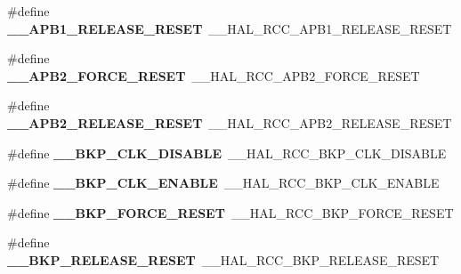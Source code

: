 \begin{DoxyCompactItemize}
\item 
\hypertarget{group___h_a_l___r_c_c___aliased_ga497e83304224dd4740b388fe296beaf0}{\#define {\bfseries \-\_\-\-\_\-\-A\-P\-B1\-\_\-\-R\-E\-L\-E\-A\-S\-E\-\_\-\-R\-E\-S\-E\-T}~\-\_\-\-\_\-\-H\-A\-L\-\_\-\-R\-C\-C\-\_\-\-A\-P\-B1\-\_\-\-R\-E\-L\-E\-A\-S\-E\-\_\-\-R\-E\-S\-E\-T}\label{group___h_a_l___r_c_c___aliased_ga497e83304224dd4740b388fe296beaf0}

\item 
\hypertarget{group___h_a_l___r_c_c___aliased_ga92a0e6fcc37827864d686e5d023d8472}{\#define {\bfseries \-\_\-\-\_\-\-A\-P\-B2\-\_\-\-F\-O\-R\-C\-E\-\_\-\-R\-E\-S\-E\-T}~\-\_\-\-\_\-\-H\-A\-L\-\_\-\-R\-C\-C\-\_\-\-A\-P\-B2\-\_\-\-F\-O\-R\-C\-E\-\_\-\-R\-E\-S\-E\-T}\label{group___h_a_l___r_c_c___aliased_ga92a0e6fcc37827864d686e5d023d8472}

\item 
\hypertarget{group___h_a_l___r_c_c___aliased_ga68340225a9f3449d73f454972cf01726}{\#define {\bfseries \-\_\-\-\_\-\-A\-P\-B2\-\_\-\-R\-E\-L\-E\-A\-S\-E\-\_\-\-R\-E\-S\-E\-T}~\-\_\-\-\_\-\-H\-A\-L\-\_\-\-R\-C\-C\-\_\-\-A\-P\-B2\-\_\-\-R\-E\-L\-E\-A\-S\-E\-\_\-\-R\-E\-S\-E\-T}\label{group___h_a_l___r_c_c___aliased_ga68340225a9f3449d73f454972cf01726}

\item 
\hypertarget{group___h_a_l___r_c_c___aliased_ga266ad5c1a161c961123d8f3d6db2fc69}{\#define {\bfseries \-\_\-\-\_\-\-B\-K\-P\-\_\-\-C\-L\-K\-\_\-\-D\-I\-S\-A\-B\-L\-E}~\-\_\-\-\_\-\-H\-A\-L\-\_\-\-R\-C\-C\-\_\-\-B\-K\-P\-\_\-\-C\-L\-K\-\_\-\-D\-I\-S\-A\-B\-L\-E}\label{group___h_a_l___r_c_c___aliased_ga266ad5c1a161c961123d8f3d6db2fc69}

\item 
\hypertarget{group___h_a_l___r_c_c___aliased_ga04daaca6a8e6c062dfc6dc3e50341b26}{\#define {\bfseries \-\_\-\-\_\-\-B\-K\-P\-\_\-\-C\-L\-K\-\_\-\-E\-N\-A\-B\-L\-E}~\-\_\-\-\_\-\-H\-A\-L\-\_\-\-R\-C\-C\-\_\-\-B\-K\-P\-\_\-\-C\-L\-K\-\_\-\-E\-N\-A\-B\-L\-E}\label{group___h_a_l___r_c_c___aliased_ga04daaca6a8e6c062dfc6dc3e50341b26}

\item 
\hypertarget{group___h_a_l___r_c_c___aliased_ga91a4e9e2dcb7942be268a76e233c4bf2}{\#define {\bfseries \-\_\-\-\_\-\-B\-K\-P\-\_\-\-F\-O\-R\-C\-E\-\_\-\-R\-E\-S\-E\-T}~\-\_\-\-\_\-\-H\-A\-L\-\_\-\-R\-C\-C\-\_\-\-B\-K\-P\-\_\-\-F\-O\-R\-C\-E\-\_\-\-R\-E\-S\-E\-T}\label{group___h_a_l___r_c_c___aliased_ga91a4e9e2dcb7942be268a76e233c4bf2}

\item 
\hypertarget{group___h_a_l___r_c_c___aliased_ga3b4efa57000a06d76a4c40feff772416}{\#define {\bfseries \-\_\-\-\_\-\-B\-K\-P\-\_\-\-R\-E\-L\-E\-A\-S\-E\-\_\-\-R\-E\-S\-E\-T}~\-\_\-\-\_\-\-H\-A\-L\-\_\-\-R\-C\-C\-\_\-\-B\-K\-P\-\_\-\-R\-E\-L\-E\-A\-S\-E\-\_\-\-R\-E\-S\-E\-T}\label{group___h_a_l___r_c_c___aliased_ga3b4efa57000a06d76a4c40feff772416}


\end{DoxyCompactItemize}
